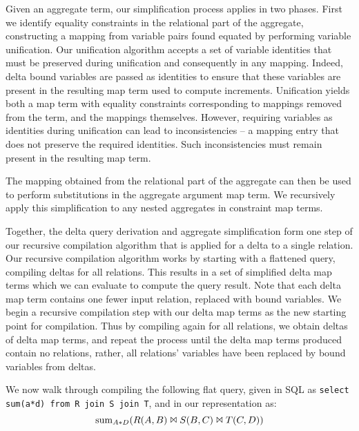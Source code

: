 Given an aggregate term, our simplification process applies in two phases. First
we identify equality constraints in the relational part of the aggregate,
constructing a mapping from variable pairs found equated by performing variable
unification. Our unification algorithm accepts a set of variable identities that
must be preserved during unification and consequently in any mapping. Indeed,
delta bound variables are passed as identities to ensure that these variables
are present in the resulting map term used to compute increments. Unification
yields both a map term with equality constraints corresponding to mappings
removed from the term, and the mappings themselves. However, requiring variables
as identities during unification can lead to inconsistencies -- a mapping entry
that does not preserve the required identities. Such inconsistencies must remain
present in the resulting map term.

The mapping obtained from the relational part of the aggregate can then be used
to perform substitutions in the aggregate argument map term. We recursively
apply this simplification to any nested aggregates in constraint map terms.

Together, the delta query derivation and aggregate simplification form one step
of our recursive compilation algorithm that is applied for a delta to a single
relation. Our recursive compilation algorithm works by starting with a flattened
query, compiling deltas for all relations. This results in a set of simplified
delta map terms which we can evaluate to compute the query result. Note that
each delta map term contains one fewer input relation, replaced with bound
variables. We begin a recursive compilation step with our delta map
terms as the new starting point for compilation. Thus by compiling again for
all relations, we obtain deltas of delta map terms, and repeat the process until
the delta map terms produced contain no relations, rather, all relations'
variables have been replaced by bound variables from deltas.


We now walk through compiling the following flat query, given in SQL as
\texttt{select sum(a*d) from R join S join T}, and in our representation as:
\[\mathrm{sum}_{A*D}(R(A,B) \Join S(B,C) \Join T(C,D))\]

